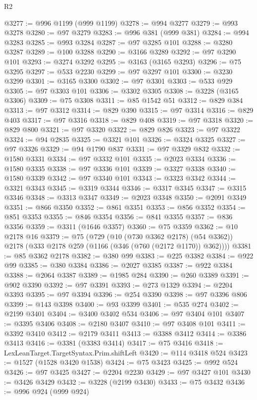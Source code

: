 \begin{lexlean}{R2}
\begin{coremodule}
@3277 := @996 @1199 (@999 @1199)
@3278 := @994 @3277
@3279 := @993 @3278
@3280 := @97 @3279
@3283 := @996 @381 (@999 @381)
@3284 := @994 @3283
@3285 := @993 @3284
@3287 := @97 @3285 @101
@3288 := @3280 @3287
@3289 := @100 @3288
@3290 := @3166 @3289
@3292 := @97 @3290 @101
@3293 := @3274 @3292
@3295 := @3163 (@3165 @3293)
@3296 := @75 @3295
@3297 := @533 @2230
@3299 := @97 @3297 @101
@3300 := @3230 @3299
@3301 := @3165 @3300
@3302 := @97 @3301
@3303 := @533 @929
@3305 := @97 @3303 @101
@3306 := @3302 @3305
@3308 := @3228 (@3165 @3306)
@3309 := @75 @3308
@3311 := @85 @1542 @51
@3312 := @829 @384
@3313 := @97 @3312
@3314 := @829 @390
@3315 := @97 @3314
@3316 := @829 @403
@3317 := @97 @3316
@3318 := @829 @408
@3319 := @97 @3318
@3320 := @829 @800
@3321 := @97 @3320
@3322 := @829 @826
@3323 := @97 @3322
@3324 := @94 @2835
@3325 := @3321 @101
@3326 := @3324 @3325
@3327 := @97 @3326
@3329 := @94 @1790 @837
@3331 := @97 @3329 @832
@3332 := @1580 @3331
@3334 := @97 @3332 @101
@3335 := @2023 @3334
@3336 := @1580 @3335
@3338 := @97 @3336 @101
@3339 := @3327 @3338
@3340 := @1580 @3339
@3342 := @97 @3340 @101
@3343 := @3323 @3342
@3344 := @3321 @3343
@3345 := @3319 @3344
@3346 := @3317 @3345
@3347 := @3315 @3346
@3348 := @3313 @3347
@3349 := @2023 @3348
@3350 := @2091 @3349
@3351 := @866 @3350
@3352 := @861 @3351
@3353 := @856 @3352
@3354 := @851 @3353
@3355 := @846 @3354
@3356 := @841 @3355
@3357 := @836 @3356
@3359 := @3311 (@1646 @3357)
@3360 := @75 @3359
@3362 := @10 @2178 @16
@3379 := @75
    (@729
      (@10 (@730 @3362 @2178) (@54 @3362))
      @2178
      (@333 @2178 @259 (@1166 (@346 (@760 (@2172 @1170)) @362))))
@3381 := @85 @3362 @2178
@3382 := @380 @99
@3383 := @225 @3382
@3384 := @922 @99
@3385 := @380 @3384
@3386 := @2027 @3385
@3387 := @922 @3384
@3388 := @2064 @3387
@3389 := @1985 @284
@3390 := @260 @3389
@3391 := @902 @3390
@3392 := @97 @3391
@3393 := @273 @1329
@3394 := @2204 @3393
@3395 := @97 @3394
@3396 := @254 @3390
@3398 := @97 @3396 @806
@3399 := @143 @3398
@3400 := @93 @3399
@3401 := @535 @274
@3402 := @2199 @3401
@3404 := @3400 @3402 @534
@3406 := @97 @3404 @101
@3407 := @3395 @3406
@3408 := @2180 @3407
@3410 := @97 @3408 @101
@3411 := @3392 @3410
@3412 := @2179 @3411
@3413 := @3388 @3412
@3414 := @3386 @3413
@3416 := @3381 (@3383 @3414)
@3417 := @75 @3416
@3418 := LexLeanTarget.TargetSyntax.Prim.shiftLeft
@3420 := @114 @3418 @524
@3423 := @1527 (@1528 @3420 @1538)
@3424 := @75 @3423
@3425 := @992 @524
@3426 := @97 @3425
@3427 := @2204 @2230
@3429 := @97 @3427 @101
@3430 := @3426 @3429
@3432 := @3228 (@2199 @3430)
@3433 := @75 @3432
@3436 := @996 @924 (@999 @924)

\end{coremodule}
\end{lexlean}
